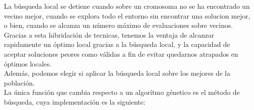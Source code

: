 \documentclass[a4paper, 12pt]{article}
\begin{document}
      La búsqueda local se detiene cuando sobre un cromosoma no se ha encontrado un vecino mejor, cuando se explora todo el entorno sin encontrar una solucion mejor, o bien, cuando se alcanza un número máximo de evaluaciones sobre vecinos.\\
      	
      Gracias a esta hibridación de tecnicas, tenemos la ventaja de alcanzar rapidamente un óptimo local gracias a la búsqueda local, y la capacidad de aceptar soluciones peores como válidas a fin de evitar quedarnos atrapados en óptimos locales.\\
      
      Además, podemos elegir si aplicar la búsqueda local sobre los mejores de la población.\\
      
      \newpage
      La única función que cambia respecto a un algorítmo génetico es el método de búsqueda, cuya implementación es la siguiente:\\
      
\end{document}
